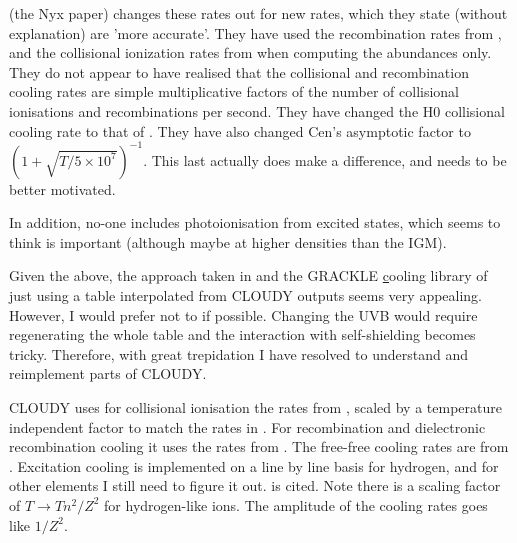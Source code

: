 \documentclass[10pt, aps, prd]{revtex4-1}
\begin{document}
\cite{Lukic:2015} (the Nyx paper) changes these rates out for new rates, which they state (without explanation) are 'more accurate'. They have used the recombination rates from \cite{Verner:1996}, and the collisional ionization rates from \cite{Voronov:1997} when computing the abundances only. They do not appear to have realised that the collisional and recombination cooling rates are simple multiplicative factors of the number of collisional ionisations and recombinations per second. They have changed the H0 collisional cooling rate to that of \cite{Scholz:1991}. They have also changed Cen's asymptotic
factor to $(1+\sqrt{T/5\times 10^7})^{-1}$. This last actually does make a difference, and needs to be better motivated.
 
In addition, no-one includes photoionisation from excited states, which \cite{Ferland:2013} seems to think is important (although maybe at higher densities than the IGM).

Given the above, the approach taken in \cite{Wiersma:2009} and the GRACKLE \href{https://grackle.readthedocs.io/} cooling library of just using a table interpolated from CLOUDY outputs seems very appealing. However, I would prefer not to if possible. Changing the UVB would require regenerating the whole table and the interaction with self-shielding becomes tricky. Therefore, with great trepidation I have resolved to understand and reimplement parts of CLOUDY. 

CLOUDY uses for collisional ionisation the rates from \cite{Verner:1996}, scaled by a temperature independent factor to match the rates in \cite{Dere:2007}.
For recombination and dielectronic recombination cooling it uses the rates from \cite{Badnell:2006}. The free-free cooling rates are from \cite{Hummer:1988}.
Excitation cooling is implemented on a line by line basis for hydrogen, and for other elements I still need to figure it out. \cite{LaMothe:2001} is cited.
Note there is a scaling factor of $T \to T n^2 /Z^2$ for hydrogen-like ions. The amplitude of the cooling rates goes like $1/Z^2$.


\end{document}
